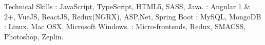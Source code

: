 \documentclass{resume}
\author{Rahmathullah M}
\begin{document}
\maketitle



\begin{category}{Technical Skills}
  : JavaScript, TypeScript, HTML5, SASS, Java.
  : Angular 1 \& 2+, VueJS, ReactJS, Redux(NGRX), ASP.Net, Spring Boot
  : MySQL, MongoDB
  : Linux, Mac OSX, Microsoft Windows.
  : Micro-frontends, Redux, SMACSS, Photoshop, Zeplin.
\end{category} 

\end{document}

